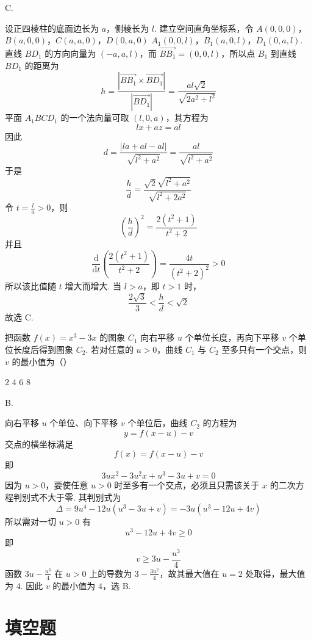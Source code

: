 \begin{answer}
C.
\end{answer}

\begin{solution}
设正四棱柱的底面边长为 \(a\)，侧棱长为 \(l\). 建立空间直角坐标系，令
\(A(0,0,0)\)，\(B(a,0,0)\)，\(C(a,a,0)\)，\(D(0,a,0)\)
\(A_1(0,0,l)\)，\(B_1(a,0,l)\)，\(D_1(0,a,l)\).
直线 \(BD_1\) 的方向向量为 \((-a,a,l)\)，而 \(\overrightarrow{BB_1}=(0,0,l)\)，所以点 \(B_1\) 到直线 \(BD_1\) 的距离为
\[
h=\frac{\left|\overrightarrow{BB_1}\times\overrightarrow{BD_1}\right|}{|\overrightarrow{BD_1}|}
=\frac{al\sqrt2}{\sqrt{2a^2+l^2}}
\]
平面 \(A_1BCD_1\) 的一个法向量可取 \((l,0,a)\)，其方程为
\[
lx+az=al
\]
因此
\[
d=\frac{|la+al-al|}{\sqrt{l^2+a^2}}=\frac{al}{\sqrt{l^2+a^2}}
\]
于是
\[
\frac hd=\frac{\sqrt2\sqrt{l^2+a^2}}{\sqrt{l^2+2a^2}}
\]
令 \(t=\frac{l}{a}>0\)，则
\[
\left(\frac hd\right)^2=\frac{2(t^2+1)}{t^2+2}
\]
并且
\[
\frac{\mathrm d}{\mathrm dt}\left(\frac{2(t^2+1)}{t^2+2}\right)
=\frac{4t}{(t^2+2)^2}>0
\]
所以该比值随 \(t\) 增大而增大. 当 \(l>a\)，即 \(t>1\) 时，
\[
\frac{2\sqrt3}{3}<\frac hd<\sqrt2
\]
故选 C.
\end{solution}

\begin{problem}
把函数 \( f(x) = x^3 - 3x \) 的图象 \(C_1\) 向右平移 \( u \) 个单位长度，再向下平移 \( v \) 个单位长度后得到图象 \(C_2\). 若对任意的 \( u > 0 \)，曲线 \(C_1\) 与 \(C_2\) 至多只有一个交点，则 \( v \) 的最小值为（\quad）

\choices
    {\(2\)}
    {\(4\)}
    {\(6\)}
    {\(8\)}
\end{problem}

\begin{answer}
B.
\end{answer}

\begin{solution}
向右平移 \(u\) 个单位、向下平移 \(v\) 个单位后，曲线 \(C_2\) 的方程为
\[
y=f(x-u)-v
\]
交点的横坐标满足
\[
f(x)=f(x-u)-v
\]
即
\[
3ux^2-3u^2x+u^3-3u+v=0
\]
因为 \(u>0\)，要使任意 \(u>0\) 时至多有一个交点，必须且只需该关于 \(x\) 的二次方程判别式不大于零. 其判别式为
\[
\Delta=9u^4-12u(u^3-3u+v)=-3u\left(u^3-12u+4v\right)
\]
所以需对一切 \(u>0\) 有
\[
u^3-12u+4v\geqslant0
\]
即
\[
v\geqslant 3u-\frac{u^3}{4}
\]
函数 \(3u-\frac{u^3}{4}\) 在 \(u>0\) 上的导数为 \(3-\frac{3u^2}{4}\)，故其最大值在 \(u=2\) 处取得，最大值为 \(4\). 因此 \(v\) 的最小值为 \(4\)，选 B.
\end{solution}

\section{填空题}

